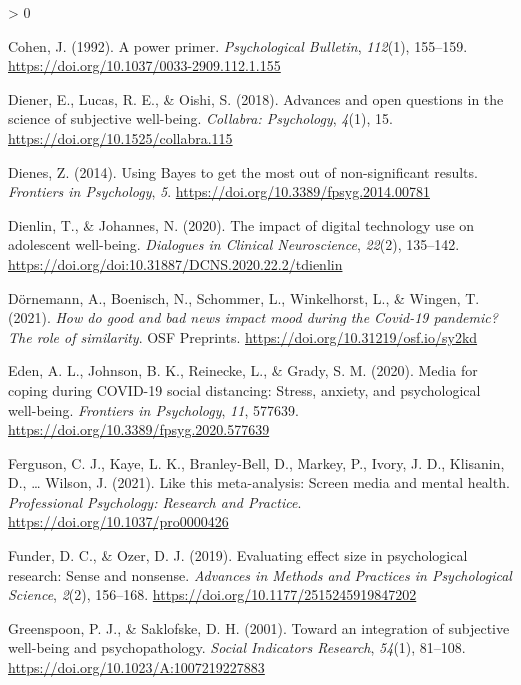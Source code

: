 \documentclass[
  english,
  man,floatsintext]{apa6}
\newlength{\cslhangindent}
\newenvironment{CSLReferences}[2] %
 {%
  \setlength{\parindent}{0pt}
  \ifodd #1 \everypar{\setlength{\hangindent}{\cslhangindent}}\ignorespaces\fi
  \ifnum #2 > 0
  \setlength{\parskip}{#2\baselineskip}
  \fi
 }%
 {}
\begin{document}
\begin{CSLReferences}{1}{0}
\leavevmode\hypertarget{ref-cohenPowerPrimer1992}{}%
Cohen, J. (1992). A power primer. \emph{Psychological Bulletin}, \emph{112}(1), 155--159. \url{https://doi.org/10.1037/0033-2909.112.1.155}

\leavevmode\hypertarget{ref-dienerAdvancesOpenQuestions2018}{}%
Diener, E., Lucas, R. E., \& Oishi, S. (2018). Advances and open questions in the science of subjective well-being. \emph{Collabra: Psychology}, \emph{4}(1), 15. \url{https://doi.org/10.1525/collabra.115}

\leavevmode\hypertarget{ref-dienesUsingBayesGet2014}{}%
Dienes, Z. (2014). Using {Bayes} to get the most out of non-significant results. \emph{Frontiers in Psychology}, \emph{5}. \url{https://doi.org/10.3389/fpsyg.2014.00781}

\leavevmode\hypertarget{ref-dienlinImpactDigitalTechnology2020}{}%
Dienlin, T., \& Johannes, N. (2020). The impact of digital technology use on adolescent well-being. \emph{Dialogues in Clinical Neuroscience}, \emph{22}(2), 135--142. \url{https://doi.org/doi:10.31887/DCNS.2020.22.2/tdienlin}

\leavevmode\hypertarget{ref-dornemannHowGoodBad2021}{}%
Dörnemann, A., Boenisch, N., Schommer, L., Winkelhorst, L., \& Wingen, T. (2021). \emph{How do good and bad news impact mood during the {Covid}-19 pandemic? {The} role of similarity}. OSF Preprints. \url{https://doi.org/10.31219/osf.io/sy2kd}

\leavevmode\hypertarget{ref-edenMediaCopingCOVID192020}{}%
Eden, A. L., Johnson, B. K., Reinecke, L., \& Grady, S. M. (2020). Media for coping during {COVID}-19 social distancing: {Stress}, anxiety, and psychological well-being. \emph{Frontiers in Psychology}, \emph{11}, 577639. \url{https://doi.org/10.3389/fpsyg.2020.577639}

\leavevmode\hypertarget{ref-fergusonThisMetaanalysisScreen2021}{}%
Ferguson, C. J., Kaye, L. K., Branley-Bell, D., Markey, P., Ivory, J. D., Klisanin, D., \ldots{} Wilson, J. (2021). Like this meta-analysis: {Screen} media and mental health. \emph{Professional Psychology: Research and Practice}. \url{https://doi.org/10.1037/pro0000426}

\leavevmode\hypertarget{ref-funderEvaluatingEffectSize2019}{}%
Funder, D. C., \& Ozer, D. J. (2019). Evaluating effect size in psychological research: {Sense} and nonsense. \emph{Advances in Methods and Practices in Psychological Science}, \emph{2}(2), 156--168. \url{https://doi.org/10.1177/2515245919847202}

\leavevmode\hypertarget{ref-greenspoonIntegrationSubjectiveWellbeing2001}{}%
Greenspoon, P. J., \& Saklofske, D. H. (2001). Toward an integration of subjective well-being and psychopathology. \emph{Social Indicators Research}, \emph{54}(1), 81--108. \url{https://doi.org/10.1023/A:1007219227883}


\end{CSLReferences}
\end{document}

